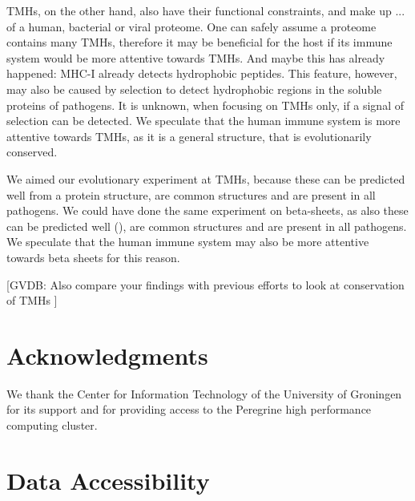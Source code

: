 
TMHs, on the other hand, also have their functional constraints, 
and make up ... of a human, bacterial or viral proteome.
One can safely assume a proteome contains many TMHs,
therefore it may be beneficial for the host
if its immune system would be more attentive towards TMHs.
And maybe this has already happened: MHC-I already detects hydrophobic
peptides. This feature, however, may also be caused by selection
to detect hydrophobic regions in the soluble proteins of pathogens.
It is unknown, when focusing on TMHs only, if a signal of selection
can be detected.
We speculate that the human immune system is more attentive 
towards TMHs, as it is a general structure, that is evolutionarily conserved.

We aimed our evolutionary experiment at TMHs, because these can
be predicted well from a protein structure,
are common structures and are present in all pathogens. 
We could have done the same experiment on beta-sheets,
as also these can be predicted well (\cite{petersen2010netturnp}),
are common structures and are present in all pathogens.
We speculate that the human immune system may also be more attentive 
towards beta sheets for this reason.

[GVDB: 
  Also compare your findings with previous efforts 
  to look at conservation of TMHs
]

\section{Acknowledgments}

We thank the Center for Information Technology of the University 
of Groningen for its support and for providing access to the Peregrine 
high performance computing cluster. 

\section{Data Accessibility}

